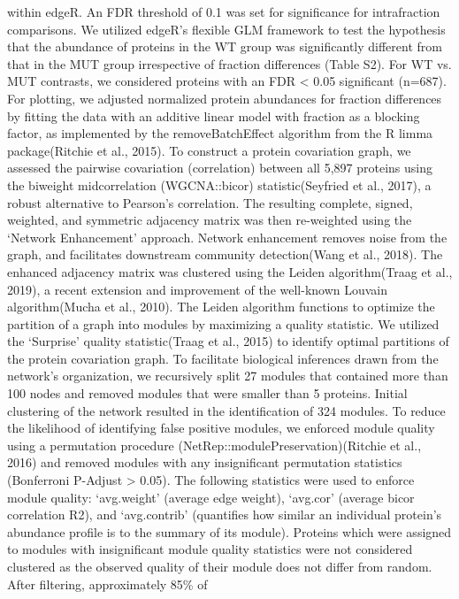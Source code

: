 within edgeR. An FDR threshold of 0.1 was set for significance for intrafraction
comparisons.  
We utilized edgeR’s flexible GLM framework to test the hypothesis that the
abundance of proteins in the WT group was significantly different from that in
the MUT group irrespective of fraction differences (Table S2). For WT vs. MUT
contrasts, we considered proteins with an FDR < 0.05 significant (n=687). For
plotting, we adjusted normalized protein abundances for fraction differences by
fitting the data with an additive linear model with fraction as a blocking
factor, as implemented by the removeBatchEffect algorithm from the R limma
package(Ritchie et al., 2015).
To construct a protein covariation graph, we assessed the pairwise covariation
(correlation) between all 5,897 proteins using the biweight midcorrelation
(WGCNA::bicor) statistic(Seyfried et al., 2017), a robust alternative to
Pearson’s correlation. The resulting complete, signed, weighted, and symmetric
adjacency matrix was then re-weighted using the ‘Network Enhancement’ approach.
Network enhancement removes noise from the graph, and facilitates downstream
community detection(Wang et al., 2018). 
The enhanced adjacency matrix was clustered using the Leiden algorithm(Traag et
al., 2019), a recent extension and improvement of the well-known Louvain
algorithm(Mucha et al., 2010). The Leiden algorithm functions to optimize the
partition of a graph into modules by maximizing a quality statistic. We utilized
the ‘Surprise’ quality statistic(Traag et al., 2015) to identify optimal
partitions of the protein covariation graph. To facilitate biological inferences
drawn from the network’s organization, we recursively split 27 modules that
contained more than 100 nodes and removed modules that were smaller than 5
proteins. Initial clustering of the network resulted in the identification of
324 modules.
To reduce the likelihood of identifying false positive modules, we enforced
module quality using a permutation procedure
(NetRep::modulePreservation)(Ritchie et al., 2016) and removed modules with any
insignificant permutation statistics (Bonferroni P-Adjust > 0.05). The following
statistics were used to enforce module quality: ‘avg.weight’ (average edge
weight), ‘avg.cor’ (average bicor correlation R2), and ‘avg.contrib’ (quantifies
how similar an individual protein’s abundance profile is to the summary of its
module). Proteins which were assigned to modules with insignificant module
quality statistics were not considered clustered as the observed quality of
their module does not differ from random. After filtering, approximately 85\% of
